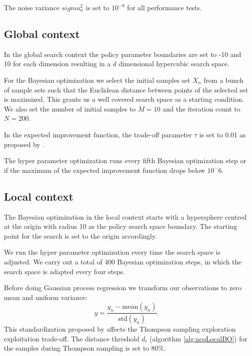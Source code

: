 The noise variance $sigma_n^2$ is set to $10^{-8}$ for all performance tests.

\subsection{Global context}

In the global search context the policy parameter boundaries are set to -10 and 10 for each dimension resulting in a $d$ dimensional hypercubic search space.

For the Bayesian optimization we select the initial samples set $X_n$ from a bunch of sample sets such that the Euclidean distance between points of the selected set is maximized. This grants us a well covered search space as a starting condition. We also set the number of initial samples to $M = 10$ and the iteration count to $N = 200$.

In the expected improvement function, the trade-off parameter $\tau$ is set to 0.01 as proposed by \cite{brochu2010tutorial}.

The hyper parameter optimization runs every fifth Bayesian optimization step or if the maximum of the expected improvement function drops below $10^-6$.

\subsection{Local context}
The Bayesian optimization in the local context starts with a hypersphere centred at the origin with radius 10 as the policy search space boundary. The starting point for the search is set to the origin accordingly.

We run the hyper parameter optimization every time the search space is adjusted. We carry out a total of 400 Bayesian optimization steps, in which the search space is adapted every four steps.

Before doing Gaussian process regression we transform our observations to zero mean and uniform variance:
$$y = \frac{y_{n}-\mathrm{mean}(y_{n})}{\mathrm{std}(y_{n})}.$$
This standardization proposed by \cite{akrour2017local} affects the Thompson sampling exploration exploitation trade-off. The distance threshold $d_t$ (algorithm \ref{alg:acqLocalBO}) for the samples during Thompson sampling is set to 80\%.

